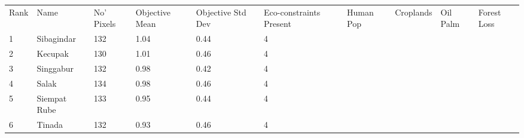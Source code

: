 \begin{table}[ht]
\centering
\begingroup\fontsize{9pt}{10pt}\selectfont
\begin{tabular}{C{0.05\textwidth}C{0.15\textwidth}C{0.08\textwidth}C{0.08\textwidth}C{0.08\textwidth}C{0.08\textwidth}C{0.08\textwidth}C{0.08\textwidth}C{0.08\textwidth}C{0.08\textwidth}}
 Rank & Name & No' Pixels & Objective Mean & Objective Std Dev & Eco-constraints  Present & Human Pop & Croplands & Oil Palm & Forest Loss \\ 
 {1} & Sibagindar & 132 & \textcolor[HTML]{FFFFFF}{1.04} & \textcolor[HTML]{000000}{0.44} & \textcolor[HTML]{000000}{4} &  &  &  &  \\ 
  {2} & Kecupak & 130 & \textcolor[HTML]{FFFFFF}{1.01} & \textcolor[HTML]{000000}{0.46} & \textcolor[HTML]{000000}{4} &  &  &  &  \\ 
  {3} & Singgabur & 132 & \textcolor[HTML]{FFFFFF}{0.98} & \textcolor[HTML]{000000}{0.42} & \textcolor[HTML]{000000}{4} &  &  &  &  \\ 
  {4} & Salak & 134 & \textcolor[HTML]{FFFFFF}{0.98} & \textcolor[HTML]{000000}{0.46} & \textcolor[HTML]{000000}{4} &  &  &  &  \\ 
  {5} & Siempat Rube & 133 & \textcolor[HTML]{000000}{0.95} & \textcolor[HTML]{000000}{0.44} & \textcolor[HTML]{000000}{4} &  &  &  &  \\ 
  {6} & Tinada & 132 & \textcolor[HTML]{000000}{0.93} & \textcolor[HTML]{000000}{0.46} & \textcolor[HTML]{000000}{4} &  &  &  &  \\ 

\end{tabular}
\end{table}
